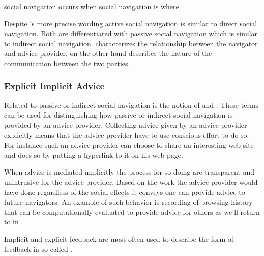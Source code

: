 \begin{items}
   social navigation occurs when
   social navigation is where
\end{items}

Despite \citeauthor{svensson03}'s more precise wording active social
navigation is similar to direct social navigation. Both are differentiated
with passive social navigation which is similar to indirect social navigation.
\citeauthor{dieberger97} characterizes the relationship between the
navigator and advice provider. \citeauthor{svensson03} on the other hand
describes the nature of the communication between the two parties.

\subsubsection{Explicit \oldand Implicit Advice}
\label{section:social.navigation.fundamental.categorization.explicit.implicit}

Related to passive or indirect social navigation is the notion
of  and .
These terms can be used for distinguishing how
passive or indirect social navigation is provided by an advice provider.
Collecting advice given by an advice provider explicitly means that
the advice provider have to use conscious effort to do so. For instance such
an advice provider can choose to share an interesting web site and does so by
putting a hyperlink to it on his web page.

When advice is mediated implicitly the process for so doing are transparent
and unintrusive for the advice provider. Based on the work the advice provider
would have done regardless of the social effects it conveys one can provide
advice to future navigators. An example of such behavior is recording of
browsing history that can be computationally evaluated to provide advice for
others as we'll return to in
.

Implicit and explicit feedback are most often used to
describe the form of feedback in so called %
\citep[]{oard98}.

